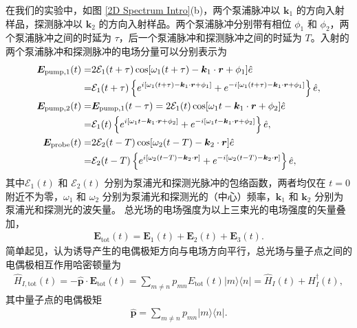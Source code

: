 \documentclass{thesis}
\begin{document}
在我们的实验中，如图 \ref{2D Spectrum Intro}(b)，两个泵浦脉冲以 $\bm{k}_1$ 的方向入射样品，探测脉冲以 $\bm{k}_2$ 的方向入射样品。两个泵浦脉冲分别带有相位 $\phi_1$ 和 $\phi_2$，两个泵浦脉冲之间的时延为 $\tau$，后一个泵浦脉冲和探测脉冲之间的时延为 $T$。入射的两个泵浦脉冲和探测脉冲的电场分量可以分别表示为
\begin{align}
    \notag\bm{E}_{\text{pump},1}(t)=&2\mathcal{E}_1(t+\tau)\cos[\omega_1(t+\tau)-\bm{k}_1\cdot\bm{r}+\phi_1]\hat{e}\\
    =&\mathcal{E}_1(t+\tau)\left\{e^{i[\omega_1(t+\tau)-\bm{k}_1\cdot\bm{r}+\phi_1]}+e^{-i[\omega_1(t+\tau)-\bm{k}_1\cdot\bm{r}+\phi_1]}\right\}\hat{e},\\
    \notag\bm{E}_{\text{pump},2}(t)=&\bm{E}_{\text{pump},1}(t-\tau)=2\mathcal{E}_1(t)\cos[\omega_1t-\bm{k}_1\cdot\bm{r}+\phi_2]\hat{e}\\
    =&\mathcal{E}_1(t)\left\{e^{i[\omega_1t-\bm{k}_1\cdot\bm{r}+\phi_2]}+e^{-i[\omega_1t-\bm{k}_1\cdot\bm{r}+\phi_2]}\right\}\hat{e},\\
    \notag\bm{E}_{\text{probe}}(t)=&2\mathcal{E}_2(t-T)\cos[\omega_2(t-T)-\bm{k}_2\cdot\bm{r}]\hat{e}\\
    =&\mathcal{E}_2(t-T)\left\{e^{i[\omega_2(t-T)-\bm{k}_2\cdot\bm{r}]}+e^{-i[\omega_2(t-T)-\bm{k}_2\cdot\bm{r}]}\right\}\hat{e},
\end{align}
其中$\mathcal{E}_1(t)$ 和 $\mathcal{E}_2(t)$ 分别为泵浦光和探测光脉冲的包络函数，两者均仅在 $t=0$ 附近不为零，$\omega_1$ 和 $\omega_2$ 分别为泵浦光和探测光的（中心）频率，$\bm{k}_1$ 和 $\bm{k}_2$ 分别为泵浦光和探测光的波矢量。
总光场的电场强度为以上三束光的电场强度的矢量叠加，
\begin{align}
    \bm{E}_{\text{tot}}(t)=\bm{E}_1(t)+\bm{E}_2(t)+\bm{E}_3(t).
\end{align}
简单起见，认为诱导产生的电偶极矩方向与电场方向平行，总光场与量子点之间的电偶极相互作用哈密顿量为
\begin{align}
    \hat{H}_{I,\text{tot}}(t)=-\hat{\bm{p}}\cdot\bm{E}_{\text{tot}}(t)=\sum_{m\neq n}p_{mn}E_{\text{tot}}(t)\lvert m\rangle\langle n\rvert=\hat{H}_I(t)+H_I^{\dagger}(t),
\end{align}
其中量子点的电偶极矩
\begin{align}
    \hat{\bm{p}}=\sum_{m\neq n}p_{mn}\lvert m\rangle\langle n\rvert.
\end{align}
\end{document}
